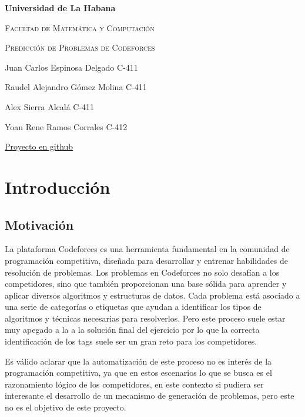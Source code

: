 \documentclass{article}
\begin{document}
\begin{titlepage}
    \centering
    {\bfseries\LARGE Universidad de La Habana \par}
    \vspace{1cm}
    {\scshape\Large Facultad de Matemática y Computación \par}
    \vspace{3cm}
    {\scshape\Huge Predicción de Problemas de Codeforces\par}
    \vfill
    
    {\Large Juan Carlos Espinosa Delgado C-411 \par}
    {\Large Raudel Alejandro Gómez Molina C-411 \par}
    {\Large Alex Sierra Alcalá C-411 \par}
    {\Large Yoan Rene Ramos Corrales C-412 \par}
    \vfill
    {\href{https://github.com/ARJ-Code/codeforce-tag-predictor}{Proyecto en github} \par}
\end{titlepage}

\section{Introducción}

\subsection{Motivación}

La plataforma Codeforces es una herramienta fundamental en la comunidad de programación competitiva, diseñada
para desarrollar y entrenar habilidades de resolución de problemas. Los problemas en Codeforces no solo desafían
a los competidores, sino que también proporcionan una base sólida para aprender y aplicar diversos algoritmos y
estructuras de datos. Cada problema está asociado a una serie de categorías o etiquetas que ayudan a identificar
los tipos de algoritmos y técnicas necesarias para resolverlos. Pero este proceso suele estar muy apegado a la
a la solución final del ejercicio por lo que la correcta identificación de los tags suele ser un gran reto para los
competidores.

Es válido aclarar que la automatización de este proceso no es interés de la programación competitiva, ya que en estos
escenarios lo que se busca es el razonamiento lógico de los competidores, en este contexto si pudiera ser interesante
el desarrollo de un mecanismo de generación de problemas, pero este no es el objetivo de este proyecto.
\end{document}
